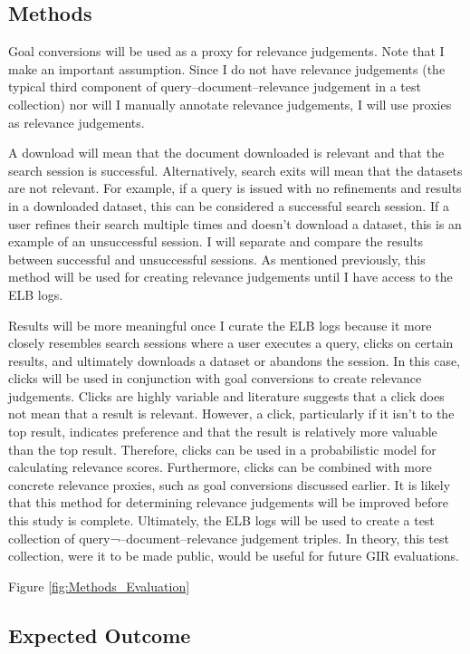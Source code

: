 \subsection{Methods}



Goal conversions will be used as a proxy for relevance judgements. Note that I make an important assumption. Since I do not have relevance judgements (the typical third component of query–document–relevance judgement in a test collection) nor will I manually annotate relevance judgements, I will use proxies as relevance judgements.

A download will mean that the document downloaded is relevant and that the search session is successful. Alternatively, search exits will mean that the datasets are not relevant. For example, if a query is issued with no refinements and results in a downloaded dataset, this can be considered a successful search session. If a user refines their search multiple times and doesn’t download a dataset, this is an example of an unsuccessful session. I will separate and compare the results between successful and unsuccessful sessions. As mentioned previously, this method will be used for creating relevance judgements until I have access to the ELB logs.

Results will be more meaningful once I curate the ELB logs because it more closely resembles search sessions where a user executes a query, clicks on certain results, and ultimately downloads a dataset or abandons the session. In this case, clicks will be used in conjunction with goal conversions to create relevance judgements. Clicks are highly variable and literature suggests that a click does not mean that a result is relevant. However, a click, particularly if it isn’t to the top result, indicates preference and that the result is relatively more valuable than the top result. Therefore, clicks can be used in a probabilistic model for calculating relevance scores. Furthermore, clicks can be combined with more concrete relevance proxies, such as goal conversions discussed earlier. It is likely that this method for determining relevance judgements will be improved before this study is complete. Ultimately, the ELB logs will be used to create a test collection of query¬–document–relevance judgement triples. In theory, this test collection, were it to be made public, would be useful for future GIR evaluations.


Figure \ref{fig:Methods_Evaluation}

\subsection{Expected Outcome}

